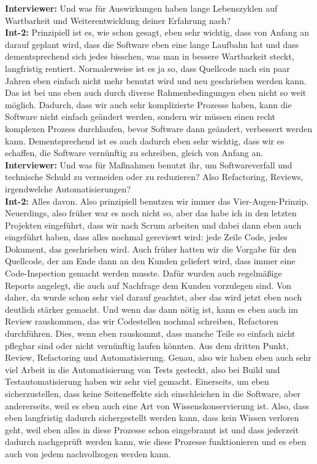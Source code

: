\textbf{Interviewer:} Und was für Auswirkungen haben lange Lebenszyklen auf Wartbarkeit und Weiterentwicklung deiner Erfahrung nach?\\
\textbf{Int-2:} Prinzipiell ist es, wie schon gesagt, eben sehr wichtig, dass von Anfang an darauf geplant wird, dass die Software eben eine lange Laufbahn hat und dass dementsprechend sich jedes bisschen, was man in bessere Wartbarkeit steckt, langfristig rentiert. Normalerweise ist es ja so, dass Quellcode nach ein paar Jahren eben einfach nicht mehr benutzt wird und neu geschrieben werden kann. Das ist bei uns eben auch durch diverse Rahmenbedingungen eben nicht so weit möglich. Dadurch, dass wir auch sehr komplizierte Prozesse haben, kann die Software nicht einfach geändert werden, sondern wir müssen einen recht komplexen Prozess durchlaufen, bevor Software dann geändert, verbessert werden kann. Dementsprechend ist es auch dadurch eben sehr wichtig, dass wir es schaffen, die Software vernünftig zu schreiben, gleich von Anfang an.\\
\textbf{Interviewer:} Und was für Maßnahmen benutzt ihr, um Softwareverfall und technische Schuld zu vermeiden oder zu reduzieren? Also Refactoring, Reviews, irgendwelche Automatisierungen? \\
\textbf{Int-2:} Alles davon. Also prinzipiell benutzen wir immer das Vier-Augen-Prinzip. Neuerdings, also früher war es noch nicht so, aber das habe ich in den letzten Projekten eingeführt, dass wir nach Scrum arbeiten und dabei dann eben auch eingeführt haben, dass alles nochmal gereviewt wird: jede Zeile Code, jedes Dokument, das geschrieben wird. Auch früher hatten wir die Vorgabe für den Quellcode, der am Ende dann an den Kunden geliefert wird, dass immer eine Code-Inspection gemacht werden musste. Dafür wurden auch regelmäßige Reports angelegt, die auch auf Nachfrage dem Kunden vorzulegen sind. Von daher, da wurde schon sehr viel darauf geachtet, aber das wird jetzt eben noch deutlich stärker gemacht. Und wenn das dann nötig ist, kann es eben auch im Review rauskommen, das wir Codestellen nochmal schreiben, Refactoren durchführen. Dies, wenn eben rauskommt, dass manche Teile so einfach nicht pflegbar sind oder nicht vernünftig laufen könnten. Aus dem dritten Punkt, Review, Refactoring und Automatisierung. Genau, also wir haben eben auch sehr viel Arbeit in die Automatisierung von Tests gesteckt, also bei Build und Testautomatisierung haben wir sehr viel gemacht. Einerseits, um eben sicherzustellen, dass keine Seiteneffekte sich einschleichen in die Software, aber andererseits, weil es eben auch eine Art von Wissenskonservierung ist. Also, dass eben langfristig dadurch sichergestellt werden kann, dass kein Wissen verloren geht, weil eben alles in diese Prozesse schon eingebrannt ist und dass jederzeit dadurch nachgeprüft werden kann, wie diese Prozesse funktionieren und es eben auch von jedem nachvollzogen werden kann. \\
